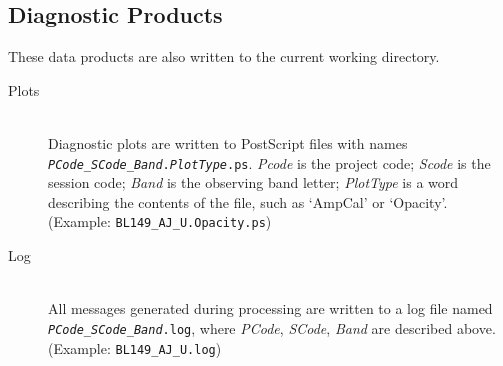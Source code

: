 \documentclass[10pt,onecolumn,final]{IEEEtran}
\begin{document}
\subsection{Diagnostic Products}

These data products are also written to the current working directory.

\begin{description}

\item[Plots] \hfill \\  Diagnostic plots are written to PostScript files with names {\tt {\em PCode}\_{\em SCode}\_{\em Band}.{\em PlotType}.ps}.  {\em Pcode} is the project code; {\em Scode} is the session code; {\em Band} is the observing band letter; {\em PlotType} is a word describing the contents of the file, such as `AmpCal' or `Opacity'.  (Example: {\tt BL149\_AJ\_U.Opacity.ps}) 
 
\item[Log] \hfill \\ All messages generated during processing are written to a log file named {\tt {\em PCode}\_{\em SCode}\_{\em Band}.log}, where {\em PCode}, {\em SCode}, {\em Band} are described above.  (Example: {\tt BL149\_AJ\_U.log})

\end{description}






%
\end{document}
